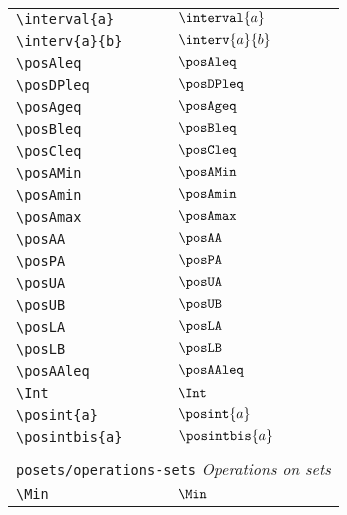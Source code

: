 \begin{longtable}{lll}
 {\color[rgb]{0.5,0.5,0.5}\texttt{\textbackslash interval\{a\}}} & $\interval{a}$ & \\ 
 {\color[rgb]{0.5,0.5,0.5}\texttt{\textbackslash interv\{a\}\{b\}}} & $\interv{a}{b}$ & \\ 
 {\color[rgb]{0.5,0.5,0.5}\texttt{\textbackslash posAleq}} & $\posAleq$ & \\ 
 {\color[rgb]{0.5,0.5,0.5}\texttt{\textbackslash posDPleq}} & $\posDPleq$ & \\ 
 {\color[rgb]{0.5,0.5,0.5}\texttt{\textbackslash posAgeq}} & $\posAgeq$ & \\ 
 {\color[rgb]{0.5,0.5,0.5}\texttt{\textbackslash posBleq}} & $\posBleq$ & \\ 
 {\color[rgb]{0.5,0.5,0.5}\texttt{\textbackslash posCleq}} & $\posCleq$ & \\ 
 {\color[rgb]{0.5,0.5,0.5}\texttt{\textbackslash posAMin}} & $\posAMin$ & \\ 
 {\color[rgb]{0.5,0.5,0.5}\texttt{\textbackslash posAmin}} & $\posAmin$ & \\ 
 {\color[rgb]{0.5,0.5,0.5}\texttt{\textbackslash posAmax}} & $\posAmax$ & \\ 
 {\color[rgb]{0.5,0.5,0.5}\texttt{\textbackslash posAA}} & $\posAA$ & \\ 
 {\color[rgb]{0.5,0.5,0.5}\texttt{\textbackslash posPA}} & $\posPA$ & \\ 
 {\color[rgb]{0.5,0.5,0.5}\texttt{\textbackslash posUA}} & $\posUA$ & \\ 
 {\color[rgb]{0.5,0.5,0.5}\texttt{\textbackslash posUB}} & $\posUB$ & \\ 
 {\color[rgb]{0.5,0.5,0.5}\texttt{\textbackslash posLA}} & $\posLA$ & \\ 
 {\color[rgb]{0.5,0.5,0.5}\texttt{\textbackslash posLB}} & $\posLB$ & \\ 
 {\color[rgb]{0.5,0.5,0.5}\texttt{\textbackslash posAAleq}} & $\posAAleq$ & \\ 
 {\color[rgb]{0.5,0.5,0.5}\texttt{\textbackslash Int}} & $\Int$ & \\ 
 {\color[rgb]{0.5,0.5,0.5}\texttt{\textbackslash posint\{a\}}} & $\posint{a}$ & \\ 
 {\color[rgb]{0.5,0.5,0.5}\texttt{\textbackslash posintbis\{a\}}} & $\posintbis{a}$ & \\ 
  &  & \\ 
 \multicolumn{3}{l}{{\color[rgb]{0.5,0.5,0.5}\texttt{posets/operations-sets}} \emph{Operations on sets}}\\ 
 \hline
{\color[rgb]{0.5,0.5,0.5}\texttt{\textbackslash Min}} & $\Min$ & \\ 

\end{longtable}
